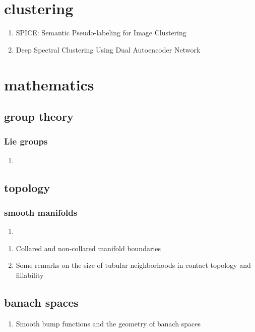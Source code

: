 \documentclass[acmlarge]{acmart}
\begin{document}
\section{clustering}
\begin{enumerate}
	\item SPICE: Semantic Pseudo-labeling for Image Clustering \cite{Niu2021SPICESP} 

	\item Deep Spectral Clustering Using Dual Autoencoder Network \cite{Yang2019DeepSC} 

\end{enumerate}
\section{mathematics}
	\subsection{group theory}
		\subsubsection{Lie groups}
		\begin{enumerate}
			\item
		\end{enumerate}
	\begin{enumerate}
	\end{enumerate}
	\subsection{topology}
		\subsubsection{smooth manifolds}
		\begin{enumerate}
			\item
		\end{enumerate}
	\begin{enumerate}
		\item Collared and non-collared manifold boundaries \cite{Baillif2022CollaredAN} 

		\item Some remarks on the size of tubular neighborhoods in contact topology and fillability \cite{Niederkruger2010SomeRO} 

	\end{enumerate}
	\subsection{banach spaces}
	\begin{enumerate}
		\item Smooth bump functions and the geometry of banach spaces \cite{Fry2002SmoothBF} 

	\end{enumerate}
\end{document}
